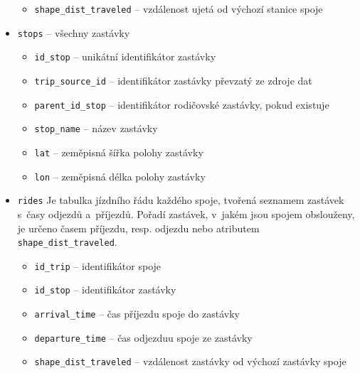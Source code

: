 \begin{itemize}
\begin{itemize}
\item \verb-shape_dist_traveled- -- vzdálenost ujetá od výchozí stanice spoje


\end{itemize}


\item \verb-stops- -- všechny zastávky


\begin{itemize}
\item \verb-id_stop- -- unikátní identifikátor zastávky


\item \verb-trip_source_id- -- identifikátor zastávky převzatý ze zdroje dat


\item \verb-parent_id_stop- -- identifikátor rodičovské zastávky, pokud existuje


\item \verb-stop_name- -- název zastávky


\item \verb-lat- -- zeměpisná šířka polohy zastávky


\item \verb-lon- -- zeměpisná délka polohy zastávky


\end{itemize}


\item \verb-rides- Je tabulka jízdního řádu každého spoje, tvořená seznamem zastávek s~časy odjezdů a~příjezdů. Pořadí zastávek, v~jakém jsou spojem obslouženy, je určeno časem příjezdu, resp. odjezdu nebo atributem \texttt{shape\_dist\allowbreak\_traveled}. \label{table:rides}


\begin{itemize}
\item \verb-id_trip- -- identifikátor spoje


\item \verb-id_stop- -- identifikátor zastávky


\item \verb-arrival_time- -- čas příjezdu spoje do zastávky


\item \verb-departure_time- -- čas odjezduu spoje ze zastávky


\item \verb-shape_dist_traveled- -- vzdálenost zastávky od výchozí zastávky spo\-je


\end{itemize}


\end{itemize}


